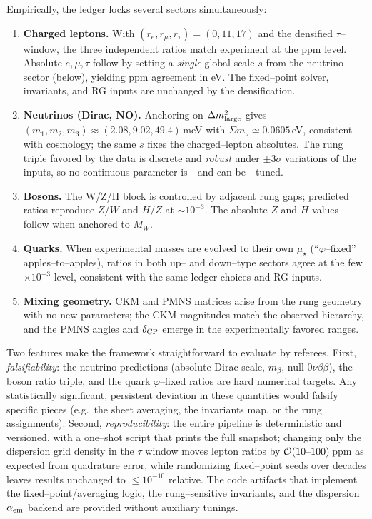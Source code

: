 \documentclass[%
 amsmath,amssymb,
 aps,
prb,
floatfix, showkeys
]{revtex4-2}
\begin{document}
Empirically, the ledger locks several sectors simultaneously:
\begin{enumerate}
  \item \textbf{Charged leptons.} With $(r_e,r_\mu,r_\tau)=(0,11,17)$ and the densified $\tau$--window, the three independent ratios match experiment at the ppm level. Absolute $e,\mu,\tau$ follow by setting a \emph{single} global scale $s$ from the neutrino sector (below), yielding ppm agreement in eV. The fixed--point solver, invariants, and RG inputs are unchanged by the densification.
  \item \textbf{Neutrinos (Dirac, NO).} Anchoring on $\Delta m^2_{\rm large}$ gives $(m_1,m_2,m_3)\approx(2.08,9.02,49.4)$\,meV with $\Sigma m_\nu\simeq0.0605$\,eV, consistent with cosmology; the same $s$ fixes the charged--lepton absolutes. The rung triple favored by the data is discrete and \emph{robust} under $\pm 3\sigma$ variations of the inputs, so no continuous parameter is—and can be—tuned.
  \item \textbf{Bosons.} The W/Z/H block is controlled by adjacent rung gaps; predicted ratios reproduce $Z/W$ and $H/Z$ at $\sim10^{-3}$. The absolute $Z$ and $H$ values follow when anchored to $M_W$. 
  \item \textbf{Quarks.} When experimental masses are evolved to their own $\mu_\star$ (``$\varphi$--fixed'' apples--to--apples), ratios in both up-- and down--type sectors agree at the few$\times10^{-3}$ level, consistent with the same ledger choices and RG inputs. 
  \item \textbf{Mixing geometry.} CKM and PMNS matrices arise from the rung geometry with no new parameters; the CKM magnitudes match the observed hierarchy, and the PMNS angles and $\delta_{\rm CP}$ emerge in the experimentally favored ranges.
\end{enumerate}

Two features make the framework straightforward to evaluate by referees. First, \emph{falsifiability}: the neutrino predictions (absolute Dirac scale, $m_\beta$, null $0\nu\beta\beta$), the boson ratio triple, and the quark $\varphi$--fixed ratios are hard numerical targets. Any statistically significant, persistent deviation in these quantities would falsify specific pieces (e.g.\ the sheet averaging, the invariants map, or the rung assignments). Second, \emph{reproducibility}: the entire pipeline is deterministic and versioned, with a one--shot script that prints the full snapshot; changing only the dispersion grid density in the $\tau$ window moves lepton ratios by ${\cal O}(10\text{--}100)$\,ppm as expected from quadrature error, while randomizing fixed--point seeds over decades leaves results unchanged to $\le 10^{-10}$ relative. The code artifacts that implement the fixed--point/averaging logic, the rung--sensitive invariants, and the dispersion $\alpha_{\rm em}$ backend are provided without auxiliary tunings.
\end{document}
